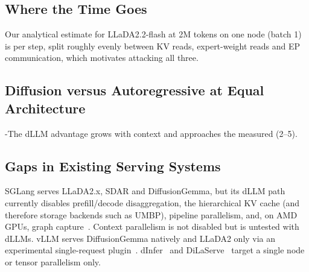 \subsection{Where the Time Goes}

 Our analytical estimate for LLaDA2.2-flash at 2M tokens on one node
(batch 1) is  per step, split roughly evenly between KV reads, expert-weight
reads and EP communication, which motivates attacking all three.

\subsection{Diffusion versus Autoregressive at Equal Architecture}

\hyp{The dLLM advantage grows with context and approaches the measured \TPF (2--5).}

\subsection{Gaps in Existing Serving Systems}
\label{sec:char-gaps}
SGLang serves LLaDA2.x, SDAR and DiffusionGemma, but its dLLM path currently disables
prefill/decode disaggregation, the hierarchical KV cache (and therefore storage backends such as
UMBP), pipeline parallelism, and, on AMD GPUs, graph capture~\cite{sglangdllm}. Context parallelism
is not disabled but is untested with dLLMs. vLLM serves DiffusionGemma natively and LLaDA2 only via
an experimental single-request plugin~\cite{diffusiongemma}. dInfer~\cite{ma2025dinfer} and
DiLaServe~\cite{chang2026dilaserve} target a single node or tensor parallelism only.
